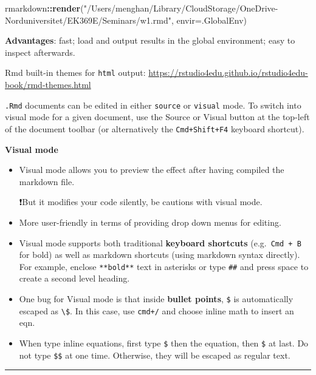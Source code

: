 \documentclass[
  a4paper,
  twoside,
  openright]{book}
\newenvironment{Shaded}{\begin{snugshade}}{\end{snugshade}}
\newcommand{\AttributeTok}[1]{\textcolor[rgb]{0.13,0.29,0.53}{#1}}
\newcommand{\FunctionTok}[1]{\textcolor[rgb]{0.13,0.29,0.53}{\textbf{#1}}}
\newcommand{\NormalTok}[1]{#1}
\newcommand{\SpecialCharTok}[1]{\textcolor[rgb]{0.81,0.36,0.00}{\textbf{#1}}}
\newcommand{\StringTok}[1]{\textcolor[rgb]{0.31,0.60,0.02}{#1}}
\theoremstyle{definition}
\theoremstyle{definition}
\theoremstyle{definition}
\theoremstyle{definition}
\theoremstyle{remark}
\begin{document}
\begin{Shaded}
\begin{Highlighting}[]
\NormalTok{rmarkdown}\SpecialCharTok{::}\FunctionTok{render}\NormalTok{(}\StringTok{"/Users/menghan/Library/CloudStorage/OneDrive{-}Norduniversitet/EK369E/Seminars/w1.rmd"}\NormalTok{, }\AttributeTok{envir=}\NormalTok{.GlobalEnv)}
\end{Highlighting}
\end{Shaded}

\textbf{Advantages}: fast; load and output results in the global environment; easy to inspect afterwards.

Rmd built-in themes for \texttt{html} output: \url{https://rstudio4edu.github.io/rstudio4edu-book/rmd-themes.html}

\texttt{.Rmd} documents can be edited in either \texttt{source} or \texttt{visual} mode. To switch into visual mode for a given document, use the Source or Visual button at the top-left of the document toolbar (or alternatively the \texttt{Cmd+Shift+F4} keyboard shortcut).

\textbf{Visual mode}

\begin{itemize}
\item
  Visual mode allows you to preview the effect after having compiled the markdown file.

  ❗️But it modifies your code silently, be cautions with visual mode.
\item
  More user-friendly in terms of providing drop down menus for editing.
\item
  Visual mode supports both traditional \textbf{keyboard shortcuts} (e.g.~\texttt{Cmd\ +\ B} for bold) as well as markdown shortcuts (using markdown syntax directly). For example, enclose \texttt{**bold**} text in asterisks or type \texttt{\#\#} and press space to create a second level heading.
\item
  One bug for Visual mode is that inside \textbf{bullet points}, \texttt{\$} is automatically escaped as \texttt{\textbackslash{}\$}. In this case, use {\texttt{cmd+/}} and choose {inline math} to insert an eqn.
\item
  When type inline equations, first type \texttt{\$} then the equation, then \texttt{\$} at last. Do not type \texttt{\$\$} at one time. Otherwise, they will be escaped as regular text.
\end{itemize}

\begin{center}\rule{0.5\linewidth}{0.5pt}\end{center}
\end{document}
